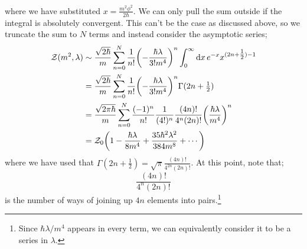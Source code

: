where we have substituted $x = \tfrac{m^2 \phi^2}{2\hbar}$. We can only pull the sum outside if the integral is absolutely convergent. This can't be the case as discussed above, so we truncate the sum to $N$ terms and instead consider the asymptotic series;
\begin{align}
\mZ(m^2, \lambda) &\sim \frac{\sqrt{2\hbar}}{m}\sum_{n=0}^{N}{\frac{1}{n!}\left(-\frac{\hbar\lambda}{3!m^4}\right)^n \int_{0}^{\infty}{\upd{x}e^{-x}x^{(2n + \tfrac{1}{2}) - 1}}} \nonumber \\
&= \frac{\sqrt{2\hbar}}{m}\sum_{n=0}^{N}{\frac{1}{n!}\left(-\frac{\hbar\lambda}{3!m^4}\right)^n \Gamma(2n + \tfrac{1}{2})} \nonumber \\
&= \frac{\sqrt{2\pi \hbar}}{m}\sum_{n=0}^{N}{\frac{(-1)^n}{n!}\frac{1}{(4!)^n}}\frac{(4n)!}{4^n (2n)!}\left(\frac{\hbar\lambda}{m^4}\right)^n \nonumber \\
&= \mZ_0\left(1 - \frac{\hbar \lambda}{8m^4} + \frac{35 \hbar^2\lambda^2}{384 m^8} + \cdots \right)
\end{align}
where we have used that $\Gamma(2n + \tfrac{1}{2}) = \sqrt{\pi}\tfrac{(4n)!}{4^{2n}(2n)!}$. At this point, note that;
\begin{equation}
\frac{(4n)!}{4^n (2n)!}
\end{equation}
is the number of ways of joining up $4n$ elements into pairs.\footnote{Since $\hbar \lambda/m^4$ appears in every term, we can equivalently consider it to be a series in $\lambda$.}\footnotemark
{}
